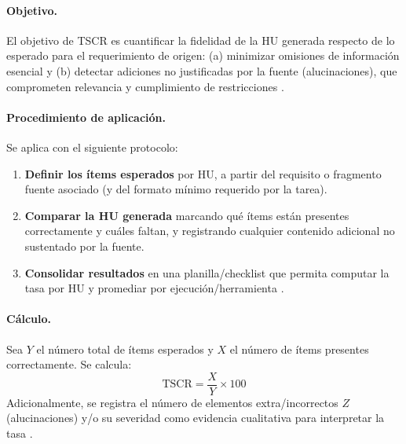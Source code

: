 \paragraph{Objetivo.}
El objetivo de TSCR es cuantificar la fidelidad de la HU generada respecto de lo esperado para el requerimiento de origen: (a) minimizar omisiones de información esencial y (b) detectar adiciones no justificadas por la fuente (alucinaciones), que comprometen relevancia y cumplimiento de restricciones \cite{yu2026evaluating_genai_quality_multicase}.

\paragraph{Procedimiento de aplicación.}
Se aplica con el siguiente protocolo:
\begin{enumerate}
    \item \textbf{Definir los ítems esperados} por HU, a partir del requisito o fragmento fuente asociado (y del formato mínimo requerido por la tarea).
    \item \textbf{Comparar la HU generada} marcando qué ítems están presentes correctamente y cuáles faltan, y registrando cualquier contenido adicional no sustentado por la fuente.
    \item \textbf{Consolidar resultados} en una planilla/checklist que permita computar la tasa por HU y promediar por ejecución/herramienta \cite{yu2026evaluating_genai_quality_multicase}.
\end{enumerate}

\paragraph{Cálculo.}
Sea $Y$ el número total de ítems esperados y $X$ el número de ítems presentes correctamente. Se calcula:
\[
\text{TSCR} = \frac{X}{Y}\times 100
\]
Adicionalmente, se registra el número de elementos extra/incorrectos $Z$ (alucinaciones) y/o su severidad como evidencia cualitativa para interpretar la tasa \cite{yu2026evaluating_genai_quality_multicase}.

